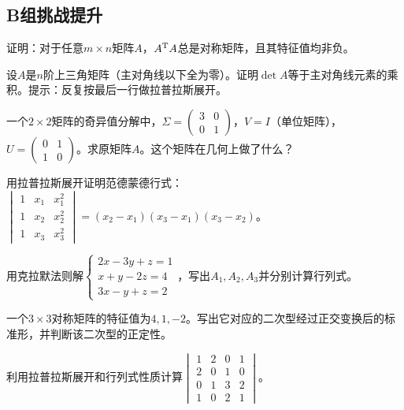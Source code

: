 \subsection*{B组\quad 挑战提升}
\begin{exercise}
\item 证明：对于任意$m\times n$矩阵$A$，$A^{\text T}A$总是对称矩阵，且其特征值均非负。
\item 设$A$是$n$阶上三角矩阵（主对角线以下全为零）。证明$\det A$等于主对角线元素的乘积。提示：反复按最后一行做拉普拉斯展开。
\item 一个$2\times2$矩阵的奇异值分解中，$\Sigma=\begin{pmatrix}3&0\\0&1\end{pmatrix}$，$V=I$（单位矩阵），$U=\begin{pmatrix}0&1\\1&0\end{pmatrix}$。求原矩阵$A$。这个矩阵在几何上做了什么？
\item 用拉普拉斯展开证明范德蒙德行式：
$\begin{vmatrix}1&x_1&x_1^2\\1&x_2&x_2^2\\1&x_3&x_3^2\end{vmatrix}=(x_2-x_1)(x_3-x_1)(x_3-x_2)$。
\item 用克拉默法则解$\begin{cases}2x-3y+z=1\\x+y-2z=4\\3x-y+z=2\end{cases}$，写出$A_1,A_2,A_3$并分别计算行列式。
\item 一个$3\times3$对称矩阵的特征值为$4,1,-2$。写出它对应的二次型经过正交变换后的标准形，并判断该二次型的正定性。
\item 利用拉普拉斯展开和行列式性质计算$\begin{vmatrix}1&2&0&1\\2&0&1&0\\0&1&3&2\\1&0&2&1\end{vmatrix}$。
\end{exercise}

\newpage
